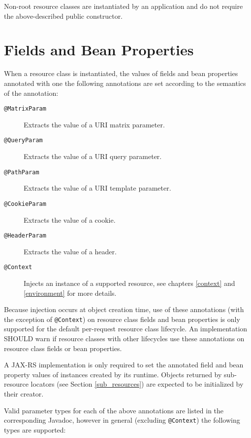Non-root resource classes are instantiated by an application and do not require the above-described public constructor.

\section{Fields and Bean Properties}
\label{resource_field}

When a resource class is instantiated, the values of fields and bean properties annotated with one the following
annotations are set according to the semantics of the annotation:

\begin{description}
    \item[\lstinline{@MatrixParam}] Extracts the value of a URI matrix parameter.
    \item[\lstinline{@QueryParam}] Extracts the value of a URI query parameter.
    \item[\lstinline{@PathParam}] Extracts the value of a URI template parameter.
    \item[\lstinline{@CookieParam}] Extracts the value of a cookie.
    \item[\lstinline{@HeaderParam}] Extracts the value of a header.
    \item[\lstinline{@Context}] Injects an instance of a supported resource, see chapters \ref{context} and
    \ref{environment} for more details.
\end{description}

Because injection occurs at object creation time, use of these annotations (with the exception of \lstinline{@Context})
on resource class fields and bean properties is only supported for the default per-request resource class lifecycle. An
implementation SHOULD warn if resource classes with other lifecycles use these annotations on resource class fields or
bean properties.

A JAX-RS implementation is only required to set the annotated field and bean property values of instances created by its
runtime. Objects returned by sub-resource locators (see Section \ref{sub_resources}) are expected to be initialized by
their creator.

Valid parameter types for each of the above annotations are listed in the corresponding Javadoc, however in general
(excluding \lstinline{@Context}) the following types are supported:

